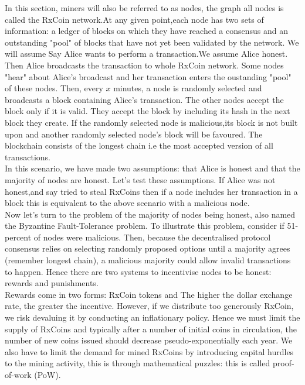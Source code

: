 In this section, miners will also be referred to as nodes, the graph all nodes is called the RxCoin network.At any given point,each node has two sets of information: a ledger of blocks on which they have reached a consensus and an outstanding "pool" of blocks that have not yet been validated by the network. We will assume 
Say Alice wants to perform a transaction.We assume Alice honest. Then Alice broadcasts the transaction to whole RxCoin network. Some nodes "hear" about Alice's broadcast and her transaction enters the oustanding "pool" of these nodes.
Then, every $x$ minutes, a node is randomly selected and broadcasts a block containing Alice's transaction. The other nodes accept the block only if it is valid. They accept the block by including its hash in the next block they create. If the randomly selected node is malicious,its block is not built upon and another randomly selected node's block will be favoured. The blockchain consists of the longest chain i.e the most accepted version of all transactions. \\

In this scenario, we have made two assumptions: that Alice is honest and that the majority of nodes are honest. 
Let's test these assumptions. If Alice was not honest,and say tried to steal RxCoins then if a node includes her transaction in a block this is equivalent to the above scenario with a malicious node. \\


Now let's turn to the problem of the majority of nodes being honest, also named the Byzantine Fault-Tolerance problem.
To illustrate this problem, consider if 51-percent of nodes were malicious. Then, because the decentralised protocol consensus relies on selecting randomly proposed options until a majority agrees (remember longest chain), a malicious majority could allow invalid transactions to happen.
Hence there are two systems to incentivise nodes to be honest: rewards and punishments.\\

Rewards come in two forms: RxCoin tokens and 
The higher the dollar exchange rate, the greater the incentive.
However, if we distribute too generously RxCoin, we risk devaluing it by conducting an inflationary policy.
Hence we must limit the supply of RxCoins and typically after a number of initial coins in circulation, the number of new coins issued should decrease pseudo-exponentially each year. We also have to limit the demand for mined RxCoins by introducing capital hurdles to the mining activity, this is through mathematical puzzles: this is called proof-of-work (PoW).\\

